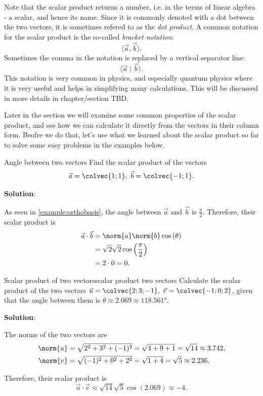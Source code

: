 Note that the scalar product returns a number, i.e. in the terms of linear algebra - a scalar, and hence its name. Since it is commonly denoted with a dot between the two vectors, it is sometimes refered to as the \emph{dot product}. A common notation for the scalar product is the so-called \emph{bracket notation}:
\[
	\langle \vec{a},\vec{b} \rangle.
\]
Sometimes the comma in the notation is replaced by a vertical separator line:
\[
	\langle \vec{a}\mid\vec{b} \rangle.
\]
This notation is very common in physics, and especially quantum physics where it is very useful and helps in simplifying many calculations. This will be discussed in more details in chapter/section TBD.

Later in the section we will examine some common properties of the scalar product, and see how we can calculate it directly from the vectors in their column form. Beofre we do that, let's use what we learned about the scalar product so far to solve some easy problems in the examples below.

\begin{example}{Angle between two vectors}{}
	Find the scalar product of the vectors
	\[
		\vec{a} = \colvec{1;1},\ \vec{b}=\colvec{-1;1}.
	\]

	\textbf{Solution}:
	
	As seen in \autoref{example:orthobasis}, the angle between $\vec{a}$ and $\vec{b}$ is $\frac{\pi}{2}$. Therefore, their scalar product is 
	\begin{align*}
		\vec{a}\cdot\vec{b} &= \norm{a}\norm{b}\cos\left(\theta\right)\\
		&= \sqrt{2}\sqrt{2}\cos\left( \frac{\pi}{2} \right)\\
		&= 2\cdot0 = 0.
	\end{align*}
\end{example}

\begin{example}{Scalar product of two vectors}{scalar product two vectors}
	Calculate the scalar product of the two vectors $\vec{u}=\colvec{2;3;-1},\ \vec{v}=\colvec{-1;0;2}$, given that the angle between them is $\theta\approx2.069\approx\ang{118.561}$.

	\vspace{1em}
	\textbf{Solution}:

	The norms of the two vectors are
	\begin{align*}
		\norm{u} &= \sqrt{2^{2}+3^{2}+(-1)^{2}} = \sqrt{4+9+1} = \sqrt{14} \approx 3.742,\\
		\norm{v} &= \sqrt{(-1)^{2}+0^{2}+2^{2}} = \sqrt{1+4} = \sqrt{5} \approx 2.236.\\
	\end{align*}

	Therefore, their scalar product is
	\[
		\vec{u}\cdot\vec{v} \approx \sqrt{14}\sqrt{5}\cos(2.069) \approx -4.
	\]
\end{example}

